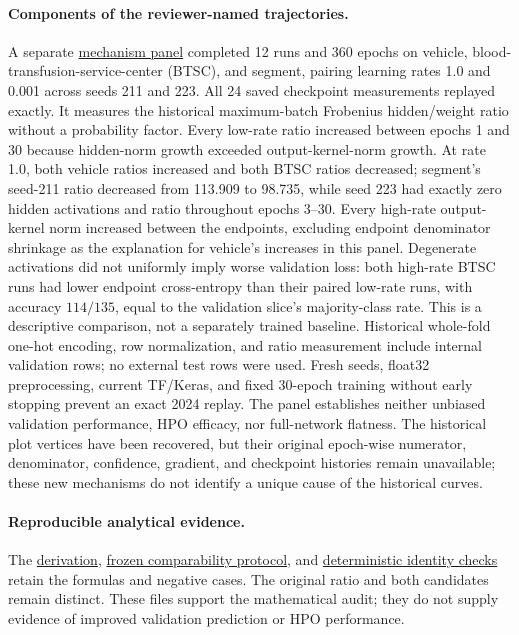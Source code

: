 \paragraph{Components of the reviewer-named trajectories.}
A separate \href{run:../sweep-results/research-audit-20261002/named-trajectory-audit/mechanism-pilot/component-summary.json}{mechanism panel} completed 12 runs and 360 epochs on vehicle, blood-transfusion-service-center (BTSC), and segment, pairing learning rates 1.0 and 0.001 across seeds 211 and 223. All 24 saved checkpoint measurements replayed exactly. It measures the historical maximum-batch Frobenius hidden/weight ratio without a probability factor. Every low-rate ratio increased between epochs 1 and 30 because hidden-norm growth exceeded output-kernel-norm growth. At rate 1.0, both vehicle ratios increased and both BTSC ratios decreased; segment's seed-211 ratio decreased from 113.909 to 98.735, while seed 223 had exactly zero hidden activations and ratio throughout epochs 3--30. Every high-rate output-kernel norm increased between the endpoints, excluding endpoint denominator shrinkage as the explanation for vehicle's increases in this panel. Degenerate activations did not uniformly imply worse validation loss: both high-rate BTSC runs had lower endpoint cross-entropy than their paired low-rate runs, with accuracy $114/135$, equal to the validation slice's majority-class rate. This is a descriptive comparison, not a separately trained baseline. Historical whole-fold one-hot encoding, row normalization, and ratio measurement include internal validation rows; no external test rows were used. Fresh seeds, float32 preprocessing, current TF/Keras, and fixed 30-epoch training without early stopping prevent an exact 2024 replay. The panel establishes neither unbiased validation performance, HPO efficacy, nor full-network flatness. The historical plot vertices have been recovered, but their original epoch-wise numerator, denominator, confidence, gradient, and checkpoint histories remain unavailable; these new mechanisms do not identify a unique cause of the historical curves.

\paragraph{Reproducible analytical evidence.}
The \href{run:../sweep-results/research-audit-20261002/normalization-audit/normalization_derivation.txt}{derivation}, \href{run:../sweep-results/research-audit-20261002/normalization-audit/normalization_protocol.json}{frozen comparability protocol}, and \href{run:../sweep-results/research-audit-20261002/normalization-audit/normalization_identity_results.json}{deterministic identity checks} retain the formulas and negative cases. The original ratio and both candidates remain distinct. These files support the mathematical audit; they do not supply evidence of improved validation prediction or HPO performance.
